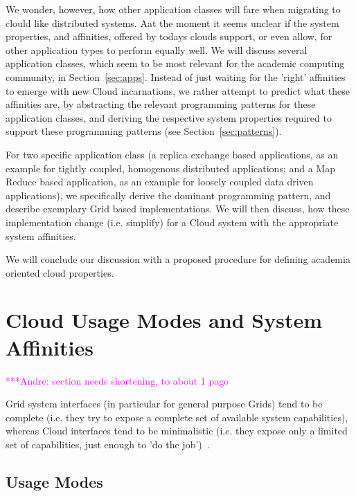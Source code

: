\documentclass{article}
\newcommand{\amnote}[1]{   {\textcolor{magenta}{ ***Andre:    #1 }}}
\newcommand{\amnote}[1]{}
\begin{document}
 We wonder, however, how other application classes will fare when
 migrating to clould like distributed systems.  Aat the moment it
 seems unclear if the system properties, and affinities, offered by
 todays clouds support, or even allow, for other application types to
 perform equally well.  We will discuss several application classes,
 which seem to be most relevant for the academic computing community,
 in Section~\ref{sec:apps}.  Instead of just waiting for the 'right'
 affinities to emerge with new Cloud incarnations, we rather attempt
 to predict what these affinities are, by abstracting the relevant
 programming patterns for these application classes, and deriving the
 respective system properties required to support these programming
 patterns (see Section~\ref{sec:patterns}).  
 
 For two specific application class (a replica exchange based
 applications, as an example for tightly coupled, homogenous
 distributed applications; and a Map Reduce based application, as an
 example for loosely coupled data driven applications), we
 specifically derive the dominant programming pattern, and describe
 exemplary Grid based implementations.  We will then discuss, how
 these implementation change (i.e. simplify) for a Cloud system with
 the appropriate system affinities.  

 We will conclude our discussion with a proposed procedure for
 defining academia oriented cloud properties.


\section{Cloud Usage Modes and System Affinities}
\label{sec:affine}
 
 \amnote{section needs shortening, to about 1 page}
 
 Grid system interfaces (in particular for general purpose Grids) tend
 to be complete (i.e. they try to expose a complete set of available
 system capabilities), whereas Cloud interfaces tend to be
 minimalistic (i.e. they expose only a limited set of capabilities,
 just enough to 'do the job')~\cite{cloud-saga-paper}.
 
 \subsection{Usage Modes}
\end{document}
